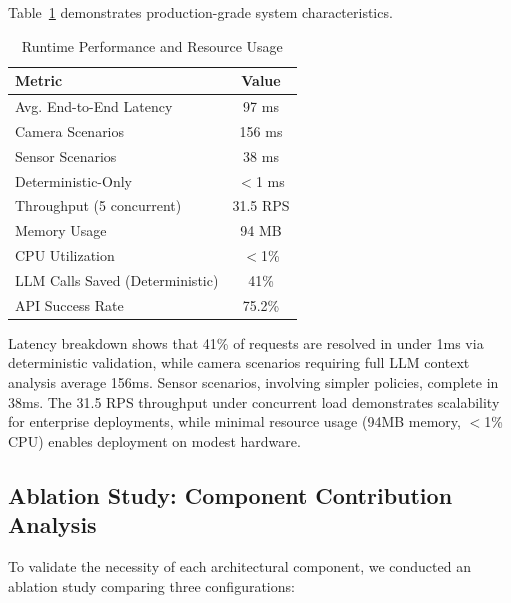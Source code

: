 \documentclass[conference]{IEEEtran}
\begin{document}
Table~\ref{tab:performance} demonstrates production-grade system characteristics.

\begin{table}[h]
    \caption{Runtime Performance and Resource Usage}
    \label{tab:performance}
    \begin{center}
        \begin{tabular}{lc}
            \toprule
            \textbf{Metric}                 & \textbf{Value} \\
            \midrule
            Avg. End-to-End Latency         & 97 ms          \\
            \quad Camera Scenarios          & 156 ms         \\
            \quad Sensor Scenarios          & 38 ms          \\
            \quad Deterministic-Only        & $<$1 ms        \\
            Throughput (5 concurrent)       & 31.5 RPS       \\
            Memory Usage                    & 94 MB          \\
            CPU Utilization                 & $<$1\%         \\
            LLM Calls Saved (Deterministic) & 41\%           \\
            API Success Rate                & 75.2\%         \\
            \bottomrule
        \end{tabular}
    \end{center}
\end{table}

Latency breakdown shows that 41\% of requests are resolved in under 1ms via deterministic validation, while camera scenarios requiring full LLM context analysis average 156ms. Sensor scenarios, involving simpler policies, complete in 38ms. The 31.5 RPS throughput under concurrent load demonstrates scalability for enterprise deployments, while minimal resource usage (94MB memory, $<$1\% CPU) enables deployment on modest hardware.


\subsection{Ablation Study: Component Contribution Analysis}

To validate the necessity of each architectural component, we conducted an ablation study comparing three configurations:
\end{document}
